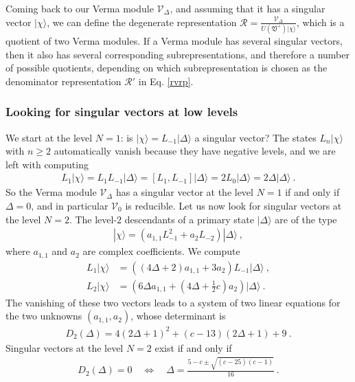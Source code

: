\documentclass[12pt, a4paper, notitlepage, twoside]{report}
\numberwithin{equation}{section}
\theoremstyle{break}
\begin{document}
Coming back to our Verma module $\mathcal{V}_\Delta$, and assuming that it has a singular vector $|\chi\rangle$, we can define the degenerate representation $\mathcal{R} = \frac{\mathcal{V}_\Delta}{U(\mathfrak{V}^+)|\chi\rangle}$, which is a quotient of two Verma modules.
If a Verma module has several singular vectors, then it also has several corresponding subrepresentations, and therefore a number of possible quotients, depending on which subrepresentation is chosen as the denominator representation $\mathcal{R}'$ in Eq. \eqref{rvrp}.

\subsubsection{Looking for singular vectors at low levels}

We start at the level $N=1$: is $|\chi\rangle=L_{-1}|\Delta\rangle$ a singular vector? The states $L_n|\chi\rangle$ with $n\geq 2$ automatically vanish because they have negative levels, and we are left with computing
\begin{align}
 L_1|\chi\rangle = L_1 L_{-1}|\Delta\rangle = [L_1,L_{-1}]|\Delta\rangle = 2L_0 |\Delta\rangle = 2\Delta|\Delta\rangle\ .
\end{align}
So the Verma module $\mathcal{V}_\Delta$ has a singular vector at the level $N=1$ if and only if $\Delta = 0$, and in particular $\mathcal{V}_0$ is reducible.
Let us now look for singular vectors at the level $N=2$.
The level-$2$ descendants of a primary state $|\Delta\rangle$ are of the type
\begin{align}
 |\chi\rangle = \left(a_{1,1} L_{-1}^2 + a_2 L_{-2}\right) |\Delta\rangle\ ,
\end{align}
where $a_{1,1}$ and $a_2$ are complex coefficients.
We compute 
\begin{align}
 L_1|\chi\rangle &= \left((4\Delta+2)a_{1,1} + 3a_2\right) L_{-1}|\Delta\rangle\ ,
\\
L_2 |\chi \rangle &= \left(6\Delta a_{1,1}+(4\Delta+\tfrac12 c) a_2\right)|\Delta\rangle\ .
\end{align}
The vanishing of these two vectors leads to a system of two linear equations for the two unknowns $(a_{1,1},a_2)$, whose determinant is 
\begin{align}
 D_2(\Delta) = 4(2\Delta+1)^2 +(c-13)(2\Delta+1) +9\ . 
\label{dud}
\end{align}
Singular vectors at the level $N=2$ exist if and only if
\begin{align}
D_2(\Delta)=0 \quad \iff \quad \Delta = \frac{5-c\pm \sqrt{(c-25)(c-1)}}{16}\ .
\label{dcscc}
\end{align}
\end{document}
